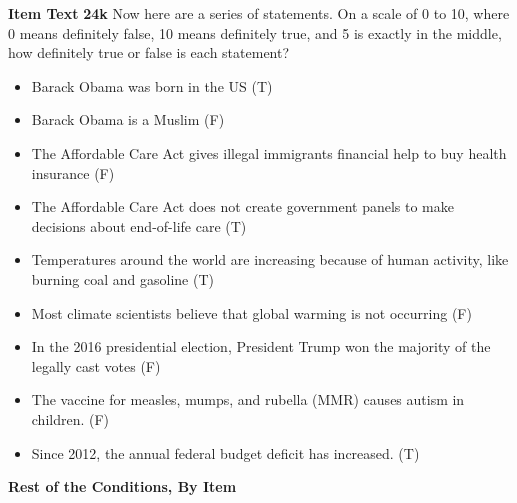 \documentclass[12pt, letterpaper]{article}
\begin{document}
\textbf{Item Text}
\textbf{24k}\newline
Now here are a series of statements. On a scale of 0 to 10, where 0 means definitely false,
10 means definitely true, and 5 is exactly in the middle, how definitely true or false is
each statement?

\begin{itemize}
	\item Barack Obama was born in the US (T)
	\item  Barack Obama is a Muslim (F)
	\item  The Affordable Care Act gives illegal immigrants financial help to buy health insurance (F)
	\item  The Affordable Care Act does not create government panels to make decisions about end-of-life care (T)
	\item  Temperatures around the world are increasing because of human activity, like burning coal and gasoline (T)
	\item  Most climate scientists believe that global warming is not occurring (F)
	\item  In the 2016 presidential election, President Trump won the majority of the legally cast votes (F)
	\item  The vaccine for measles, mumps, and rubella (MMR) causes autism in children. (F)
	\item  Since 2012, the annual federal budget deficit has increased. (T)
\end{itemize}

\textbf{Rest of the Conditions, By Item}
\end{document}
